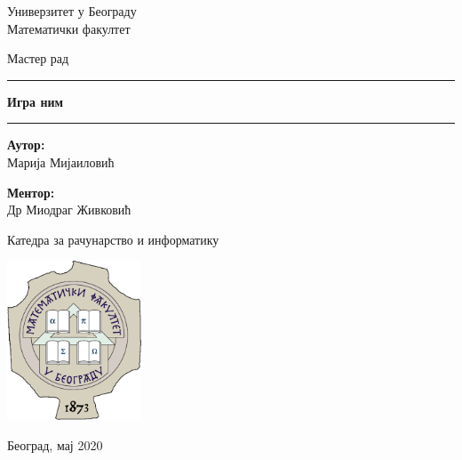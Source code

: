 \begin{titlepage}
    \begin{center}
        \vspace{0.5cm}
        
        \Large{
	        Универзитет у Београду\\
	        Математички факултет\\
        }
    
        \vspace{0.5cm}
        \Large{Мастер рад}    
        
        \vspace{2.0cm}
        
        \Huge
        \rule[0.5cm]{\textwidth}{0.5pt}
        \textbf{Игра ним}
        \rule{\textwidth}{0.5pt}
        \vspace{0.5cm}
        
        \vspace{2.0cm}
        
        \begin{minipage}[t]{0.47\textwidth}
        	\textnormal{\large{\bf Аутор:\\}}
        	{\large Марија Мијаиловић}
        \end{minipage}\hfill\begin{minipage}[t]{0.47\textwidth}\raggedleft
        	\textnormal{\large{\bf Ментор:\\}}
        	{\large Др Миодраг Живковић}
        \end{minipage}
        
        \vfill
        
        {\Large Катедра за рачунарство и информатику}
        
        \vspace{0.8cm}
        
        \includegraphics[width=0.3\textwidth]{matf_logo.png}
        
        \large{Београд, мај 2020}
        
    \end{center}
\end{titlepage}
